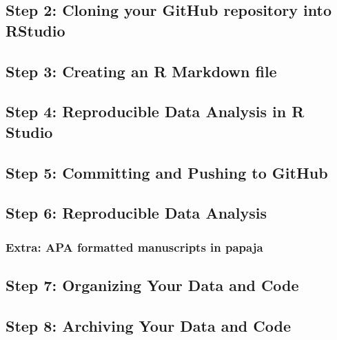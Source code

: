 \documentclass[
  oneside]{krantz}
\begin{document}
\hypertarget{step-2-cloning-your-github-repository-into-rstudio}{%
\subsection{Step 2: Cloning your GitHub repository into
RStudio}\label{step-2-cloning-your-github-repository-into-rstudio}}

\hypertarget{step-3-creating-an-r-markdown-file}{%
\subsection{Step 3: Creating an R Markdown
file}\label{step-3-creating-an-r-markdown-file}}

\hypertarget{step-4-reproducible-data-analysis-in-r-studio}{%
\subsection{Step 4: Reproducible Data Analysis in R
Studio}\label{step-4-reproducible-data-analysis-in-r-studio}}

\hypertarget{step-5-committing-and-pushing-to-github}{%
\subsection{Step 5: Committing and Pushing to
GitHub}\label{step-5-committing-and-pushing-to-github}}

\hypertarget{step-6-reproducible-data-analysis}{%
\subsection{Step 6: Reproducible Data
Analysis}\label{step-6-reproducible-data-analysis}}

\hypertarget{extra-apa-formatted-manuscripts-in-papaja}{%
\subsubsection{Extra: APA formatted manuscripts in
papaja}\label{extra-apa-formatted-manuscripts-in-papaja}}

\hypertarget{step-7-organizing-your-data-and-code}{%
\subsection{Step 7: Organizing Your Data and
Code}\label{step-7-organizing-your-data-and-code}}

\hypertarget{step-8-archiving-your-data-and-code}{%
\subsection{Step 8: Archiving Your Data and
Code}\label{step-8-archiving-your-data-and-code}}
\end{document}
